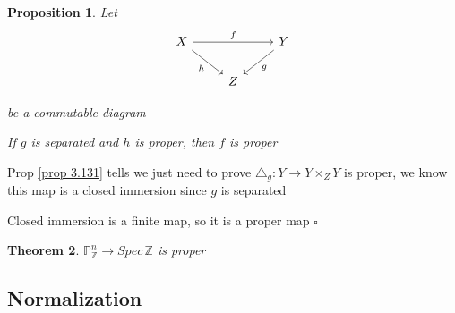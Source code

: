 \documentclass{article}
\newtheorem{theorem}{Theorem}[section]
\newtheorem{proposition}[theorem]{Proposition}
\newenvironment{Proof}{{\noindent \indent \it Proof:\quad}}{\hfill $\square$\par}
\begin{document}
\begin{proposition}
    Let
    \[\begin{tikzcd}
	X && Y \\
	& Z
	\arrow["h"', from=1-1, to=2-2]
	\arrow["f", from=1-1, to=1-3]
	\arrow["g", from=1-3, to=2-2]
\end{tikzcd}\]

be a commutable diagram

If $g$ is separated and $h$ is proper, then $f$ is proper
\end{proposition}
\begin{Proof}
    Prop \ref{prop 3.131} tells we just need to prove $\triangle_g:Y\to Y\times_Z Y$ is proper, we know this map is a closed immersion since $g$ is separated

    Closed immersion is a finite map, so it is a proper map
\end{Proof}

\begin{theorem}
    $\mathbb P^n_{\mathbb Z}\to Spec\,\mathbb Z$ is proper
\end{theorem}








\newpage
\subsection{Normalization}






\end{document}
